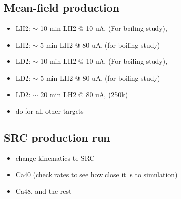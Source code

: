 \documentclass{article}
\begin{document}
\subsection{Mean-field production}
\begin{itemize}

\item LH2: $\sim$ 10 min LH2 @ 10 uA, (For boiling study), 
\item LH2: $\sim$ 5 min LH2  @ 80 uA, (for boiling study)
\item LD2: $\sim$ 10 min LH2 @ 10 uA, (For boiling study), 
\item LD2: $\sim$ 5 min LH2  @ 80 uA, (for boiling study)
\item LD2: $\sim$ 20 min LH2  @ 80 uA, (250k)
\item do for all other targets

\end{itemize}
 
 \subsection{SRC production run}
 \begin{itemize}
 \item change kinematics to SRC
 \item Ca40 (check rates to see how close it is to simulation)
 \item Ca48,  and the rest
 \end{itemize}
\end{document}

